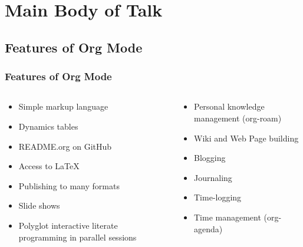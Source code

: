\documentclass[aspectratio=169]{beamer}
\begin{document}
\section{Main Body of Talk}

\subsection{Features of Org Mode}

\begin{frame}
\frametitle{Features of Org Mode}
\Large{
\begin{columns}
    \begin{column}{0.475\textwidth}
        \begin{itemize}[font=$\bullet$\scshape\bfseries]
        \item Simple markup language
        \item Dynamics tables
        \item README.org on GitHub
           \item Access to LaTeX
            \item Publishing to many formats
            \item Slide shows
            \item Polyglot interactive literate programming in parallel sessions
        \end{itemize}
    \end{column}
    \begin{column}{0.475\textwidth}
        \begin{itemize}[font=$\bullet$\scshape\bfseries]
                    \item Personal knowledge management (org-roam)
            \item Wiki and Web Page building
            \item Blogging
            \item Journaling
            \item Time-logging
            \item Time management (org-agenda)

        \end{itemize}
    \end{column}
    \end{columns}
   }
\end{frame}
\note{

}
\end{document}
